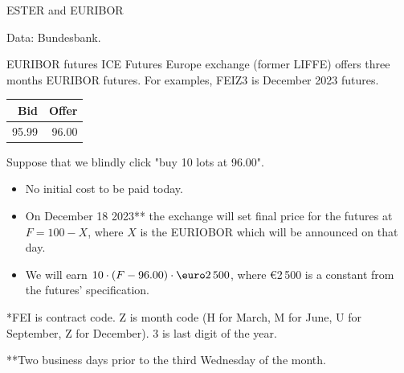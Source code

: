 \documentclass{beamer}
\renewcommand{\EUR}[1]{\textup{\euro}#1}
\begin{document}
\newcommand{\plotBenchmarkRate}[2] {
	
	\addplot[
		color = #2,
		mark = none,
		thick
	]
	table[
		x=date,
		y=#1,
		col sep=comma
	]
	{euro_benchmark.csv};
}



\begin{frame}{ESTER and EURIBOR}
\centering
{}

\scriptsize Data: Bundesbank.
\end{frame}



\begin{frame}{EURIBOR futures}
\justify
ICE Futures Europe exchange (former LIFFE) offers three months EURIBOR futures. For examples, \alert{FEIZ3} is December 2023 futures.

\justify
\centering
\begin{tabular}{r|r}
Bid & Offer \\ \hline
95.99 & 96.00
\end{tabular}

\justify
Suppose that we blindly click "buy 10 lots at 96.00".
\begin{itemize}
\justifying
\item No initial cost to be paid today.
\item On December 18 2023** the exchange will set final price for the futures at $F = 100 - X$, where 
$X$ is the EURIOBOR which will be announced on that day.
\item We will earn $10 \cdot (F - 96.00) \cdot \EUR{2\,500}$, where \EUR{2\,500} is a constant from the futures' specification.
\end{itemize}

\justify
*FEI is contract code. Z is month code (H for March, M for June, U for September, Z for December). 3 is last digit of the year.

\justify
**Two business days prior to the third Wednesday of the month.
\end{frame}
\end{document}
